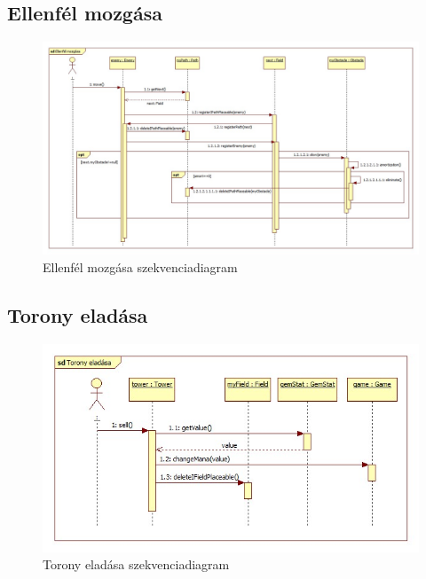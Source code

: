 \subsection{Ellenfél mozgása}
\begin{figure}[H]
\begin{center}
\includegraphics[width=17cm]{chapters/chapter03/images/Ellenfel_mozgasa.jpg}
\caption{Ellenfél mozgása szekvenciadiagram}
\label{fig:Ellenfél_mozgása}
\end{center}
\end{figure}

\subsection{Torony eladása}
\begin{figure}[H]
\begin{center}
\includegraphics[width=17cm]{chapters/chapter03/images/Torony_eladasa.jpg}
\caption{Torony eladása szekvenciadiagram}
\label{fig:Torony_eladása}
\end{center}
\end{figure}

